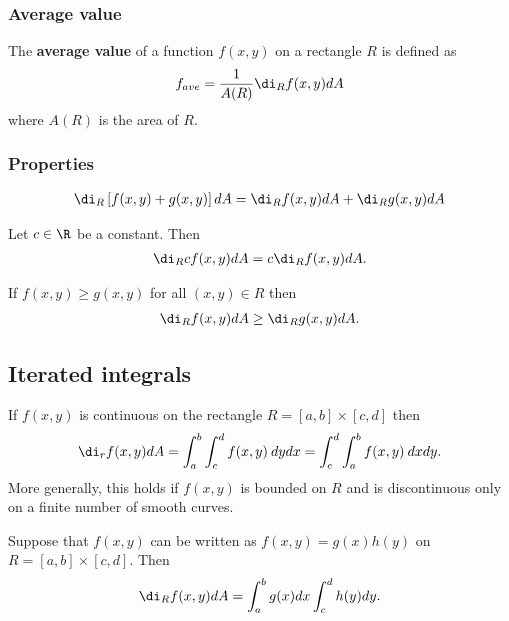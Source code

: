 \documentclass{article}
\begin{document}
\subsubsection{Average value}


\begin{definition}
    The \textbf{average value} of a function $f(x,y)$ on a rectangle $R$
    is defined as
    \begin{align*}
        f_{ave} = \frac{1}{A(R)}\di_R f(x,y)dA
    \end{align*}
    where $A(R)$ is the area of $R$.
\end{definition}


\subsubsection{Properties}


\begin{theorem}
    \begin{align*}
        \di_R\left[f(x,y)+g(x,y)\right]dA = \di_R f(x,y)dA + \di_R g(x,y)dA
    \end{align*}
\end{theorem}
\begin{theorem}
    Let $c\in\R$ be a constant. Then
    \begin{align*}
        \di_R cf(x,y)dA = c\di_R f(x,y)dA.
    \end{align*}
\end{theorem}
\begin{theorem}
    If $f(x,y)\geq g(x,y)$ for all $(x,y)\in R$ then
    \begin{align*}
        \di_R f(x,y)dA \geq \di_R g(x,y) dA.
    \end{align*}
\end{theorem}

\subsection{Iterated integrals}

\begin{theorem}
    If $f(x,y)$ is continuous on the rectangle $R=[a,b]\times[c,d]$ then
    \begin{align*}
        \di_r f(x,y)dA = \int_a^b \int_c^d f(x,y)\:dydx
        = \int_c^d \int_a^b f(x,y)\:dxdy.
    \end{align*}
    More generally, this holds if $f(x,y)$ is bounded on $R$ and is
    discontinuous only on a finite number of smooth curves.
\end{theorem}
\begin{lemma}
    Suppose that $f(x,y)$ can be written as $f(x,y)=g(x)h(y)$
    on $R=[a,b]\times[c,d]$. Then
    \begin{align*}
        \di_R f(x,y)dA = \int_a^b g(x)dx \int_c^d h(y)dy.
    \end{align*}
\end{lemma}
\end{document}
